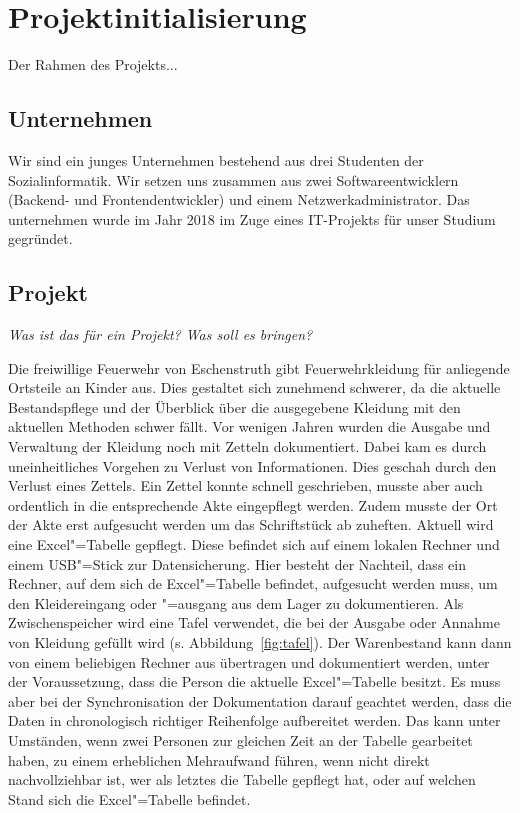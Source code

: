 \section{Projektinitialisierung}\label{sec:Projektinitialisierung}

Der Rahmen des Projekts... 

\subsection{Unternehmen}

Wir sind ein junges Unternehmen bestehend aus drei Studenten der Sozialinformatik. Wir setzen uns zusammen aus zwei Softwareentwicklern (Backend- und Frontendentwickler) und einem Netzwerkadministrator. Das unternehmen wurde im Jahr 2018 im Zuge eines IT-Projekts für unser Studium gegründet.


\subsection{Projekt}

\textit{Was ist das für ein Projekt? Was soll es bringen? }

Die freiwillige Feuerwehr von Eschenstruth gibt Feuerwehrkleidung für anliegende Ortsteile an Kinder aus. Dies gestaltet sich zunehmend schwerer, da die aktuelle Bestandspflege und der Überblick über die ausgegebene Kleidung mit den aktuellen Methoden schwer fällt. Vor wenigen Jahren wurden die Ausgabe und Verwaltung der Kleidung noch mit Zetteln dokumentiert. Dabei kam es durch uneinheitliches Vorgehen zu Verlust von Informationen. Dies geschah \zb durch den Verlust eines Zettels. Ein Zettel konnte schnell geschrieben, musste aber auch ordentlich in die entsprechende Akte eingepflegt werden. Zudem musste der Ort der Akte erst aufgesucht werden um das Schriftstück ab zuheften. 
Aktuell wird eine Excel"=Tabelle gepflegt. Diese befindet sich auf einem lokalen Rechner und einem USB"=Stick zur Datensicherung. Hier besteht der Nachteil, dass ein Rechner, auf dem sich de Excel"=Tabelle befindet, aufgesucht werden muss, um den Kleidereingang oder "=ausgang aus dem Lager zu dokumentieren. Als Zwischenspeicher wird eine Tafel verwendet, die bei der Ausgabe oder Annahme von Kleidung gefüllt wird (s. Abbildung~\ref{fig:tafel}). Der Warenbestand kann dann von einem beliebigen Rechner aus übertragen und dokumentiert werden, unter der Voraussetzung, dass die Person die aktuelle Excel"=Tabelle besitzt. Es muss aber bei der Synchronisation der Dokumentation darauf geachtet werden, dass die Daten in chronologisch richtiger Reihenfolge aufbereitet werden. Das kann unter Umständen, wenn zwei Personen zur gleichen Zeit an der Tabelle gearbeitet haben, zu einem erheblichen Mehraufwand führen, wenn nicht direkt nachvollziehbar ist, wer als letztes die Tabelle gepflegt hat, oder auf welchen Stand sich die Excel"=Tabelle befindet. 

